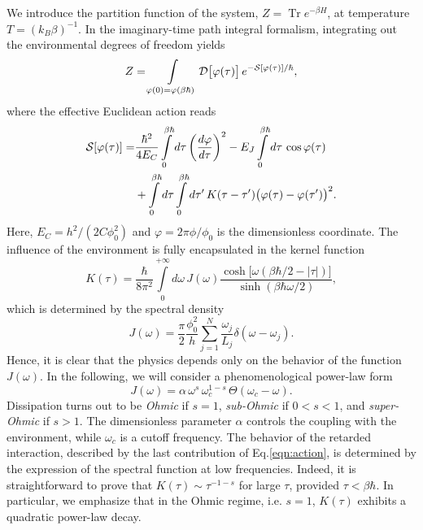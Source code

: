 \documentclass[aps,notitlepage,twocolumn,prl,nolongbibliography,superscriptaddress]{revtex4-2}
\newcommand{\Tr}{\operatorname{Tr}}
\begin{document}
We introduce the partition function of the system, $Z = \Tr e^{-\beta H}$, at temperature $T = (k_B\beta)^{-1}$.
In the imaginary-time path integral formalism, integrating out the environmental degrees of freedom yields
\begin{equation}\label{eqn:partition_path}
            Z = \int\limits_{\varphi(0)=\varphi(\beta\hbar)} {\cal D}\bigl[\varphi(\tau)\bigr] \,
            e^{-{\cal S}[\varphi(\tau)]/\hbar},
\end{equation}
where the effective Euclidean action reads
\begin{equation}\begin{split}\label{eqn:action}
            {\cal S}[\varphi(\tau)] = &\frac{\hbar^2}{4E_C}\int\limits_0^{\beta \hbar} d\tau \, \biggl(\frac{d\varphi}{d\tau}\biggr)^2
            - E_J \int\limits_0^{\beta \hbar} d\tau \, \cos \varphi(\tau) \\
            &+ \int\limits_0^{\beta \hbar} d\tau \int\limits_0^{\beta \hbar} d\tau' \,
            K(\tau-\tau') \bigl(\varphi(\tau)-\varphi(\tau')\bigr)^2.
\end{split}
\end{equation}
Here, $E_C = h^2/(2C\phi_0^2)$ and $\varphi = 2\pi\phi/\phi_0$ is the dimensionless coordinate. The influence of the environment is fully encapsulated in the kernel function
\begin{equation}\label{eqn:kernel}
            K(\tau) = \frac{\hbar}{8\pi^2}\int\limits_0^{+\infty} d\omega \, J(\omega)\frac{\cosh\bigl[\omega(\beta\hbar/2 -|\tau|)\bigr]}{\sinh(\beta\hbar\omega/2)},
\end{equation}
which is determined by the spectral density
\begin{equation}\label{eqn:spectral}
            J(\omega) = \frac{\pi}{2}\frac{\phi_0^2}{h}\sum_{j=1}^N\frac{\omega_j}{L_j} \delta(\omega-\omega_j).
\end{equation}
Hence, it is clear that the physics depends only on the behavior of the function $J(\omega)$. In the following, we will consider a phenomenological power-law form
\begin{equation}\label{eqn:spectral_form}
            J(\omega) = \alpha \, \omega^s \, \omega_c^{1-s}\,\Theta(\omega_c-\omega).
\end{equation}
Dissipation turns out to be \textit{Ohmic} if $s=1$, \textit{sub-Ohmic} if $0<s<1$, and \textit{super-Ohmic} if $s>1$. The dimensionless parameter $\alpha$ controls the coupling with the environment, while $\omega_c$ is a cutoff frequency. The behavior of the retarded interaction, described by the last contribution of Eq.\eqref{eqn:action}, is determined by the expression of the spectral function at low frequencies. Indeed, it is straightforward to prove that $K(\tau) \sim \tau^{-1-s}$ for large $\tau$, provided $\tau < \beta \hbar$. In particular, we emphasize that in the Ohmic regime, i.e. $s=1$, $K(\tau)$ exhibits a quadratic power-law decay.
\end{document}
